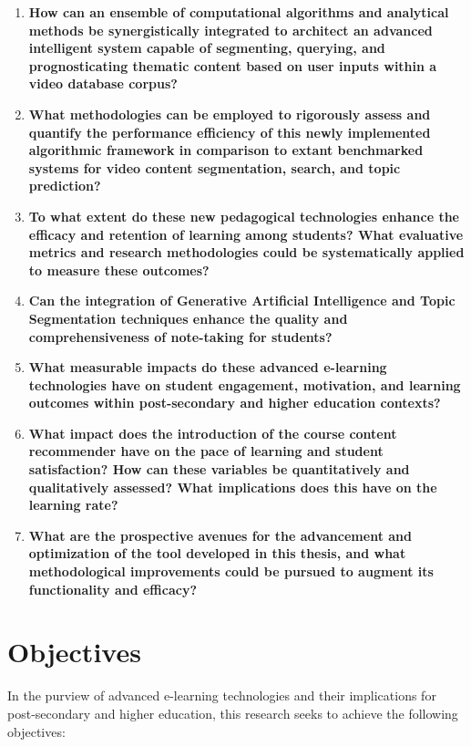 \begin{enumerate}
    \item  \textbf{How can an ensemble of computational algorithms and analytical methods be synergistically integrated to architect an advanced intelligent system capable of segmenting, querying, and prognosticating thematic content based on user inputs within a video database corpus?}

    \item \textbf{What methodologies can be employed to rigorously assess and quantify the performance efficiency of this newly implemented algorithmic framework in comparison to extant benchmarked systems for video content segmentation, search, and topic prediction?}

    \item \textbf{To what extent do these new pedagogical technologies enhance the efficacy and retention of learning among students? What evaluative metrics and research methodologies could be systematically applied to measure these outcomes?}

    \item \textbf{Can the integration of Generative Artificial Intelligence and Topic Segmentation techniques enhance the quality and comprehensiveness of note-taking for students?}
    
    \item \textbf{What measurable impacts do these advanced e-learning technologies have on student engagement, motivation, and learning outcomes within post-secondary and higher education contexts?} 

    
    \item \textbf{What impact does the introduction of the course content recommender have on the pace of learning and student satisfaction? How can these variables be quantitatively and qualitatively assessed? What implications does this have on the learning rate?}
    
    \item \textbf{What are the prospective avenues for the advancement and optimization of the tool developed in this thesis, and what methodological improvements could be pursued to augment its functionality and efficacy?}


    
\end{enumerate}








\section{Objectives}
In the purview of advanced e-learning technologies and their implications for post-secondary and higher education, this research seeks to achieve the following objectives:

